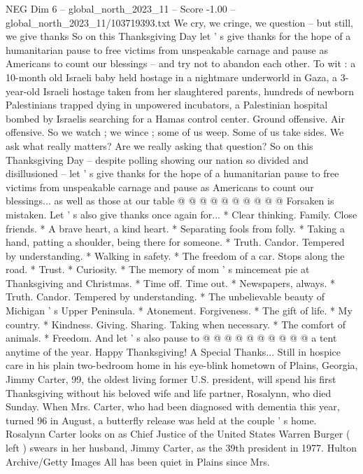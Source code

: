 \begin{textsample}{NEG Dim 6 – global\_north\_2023\_11 – Score -1.00 – global\_north\_2023\_11/103719393.txt}  \label{ex:f6_neg_232}
We cry, we cringe, we question -- but still, we give thanks So on this Thanksgiving Day let ' s give thanks for the hope of a humanitarian pause to free victims from unspeakable carnage and pause as Americans to count our blessings -- and try not to abandon each other.
To wit : a 10-month old Israeli baby held hostage in a nightmare underworld in Gaza, a 3-year-old Israeli hostage taken from her slaughtered parents, hundreds of newborn Palestinians trapped dying in unpowered incubators, a Palestinian hospital bombed by Israelis searching for a Hamas control center.
Ground offensive.
Air offensive.
So we watch ; we wince ; some of us weep.
Some of us take sides.
We ask what really matters?
Are we really asking that question?
So on this Thanksgiving Day -- despite polling showing our nation so divided and disillusioned -- let ' s give thanks for the hope of a humanitarian pause to free victims from unspeakable carnage and pause as Americans to count our blessings... as well as those at our table @ @ @ @ @ @ @ @ @ @ Forsaken is mistaken.
Let ' s also give thanks once again for... * Clear thinking.
Family.
Close friends. * A brave heart, a kind heart. * Separating fools from folly. * Taking a hand, patting a shoulder, being there for someone. * Truth.
Candor.
Tempered by understanding. * Walking in safety. * The freedom of a car.
Stops along the road. * Trust. * Curiosity. * The memory of mom ' s mincemeat pie at Thanksgiving and Christmas. * Time off.
Time out. * Newspapers, always. * Truth.
Candor.
Tempered by understanding. * The unbelievable beauty of Michigan ' s Upper Peninsula. * Atonement.
Forgiveness. * The gift of life. * My country. * Kindness.
Giving.
Sharing.
Taking when necessary. * The comfort of animals. * Freedom.
And let ' s also pause to @ @ @ @ @ @ @ @ @ @ a tent anytime of the year.
Happy Thanksgiving!
A Special Thanks...
Still in hospice care in his plain two-bedroom home in his eye-blink hometown of Plains, Georgia, Jimmy Carter, 99, the oldest living former U.S. president, will spend his first Thanksgiving without his beloved wife and life partner, Rosalynn, who died Sunday.
When Mrs.
Carter, who had been diagnosed with dementia this year, turned 96 in August, a butterfly release was held at the couple ' s home.
Rosalynn Carter looks on as Chief Justice of the United States Warren Burger ( left ) swears in her husband, Jimmy Carter, as the 39th president in 1977.
Hulton Archive/Getty Images All has been quiet in Plains since Mrs.

\end{textsample}
